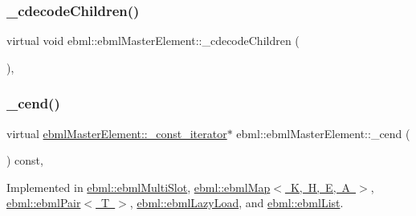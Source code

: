 \subsubsection{\texorpdfstring{\+\_\+cdecode\+Children()}{\_cdecodeChildren()}}
{\footnotesize\ttfamily virtual void ebml\+::ebml\+Master\+Element\+::\+\_\+cdecode\+Children (\begin{DoxyParamCaption}\item[{\mbox{\hyperlink{classebml_1_1parseString_1_1iterator}{parse\+String\+::iterator}} \&}]{ }\end{DoxyParamCaption})\hspace{0.3cm}{\ttfamily [protected]}, {\ttfamily [virtual]}}

\mbox{\label{classebml_1_1ebmlMasterElement_ae6cdbf68d8267a7ab098bd402fa70e88}} 
\subsubsection{\texorpdfstring{\+\_\+cend()}{\_cend()}}
{\footnotesize\ttfamily virtual \mbox{\hyperlink{classebml_1_1ebmlMasterElement_1_1__const__iterator}{ebml\+Master\+Element\+::\+\_\+const\+\_\+iterator}}$\ast$ ebml\+::ebml\+Master\+Element\+::\+\_\+cend (\begin{DoxyParamCaption}{ }\end{DoxyParamCaption}) const\hspace{0.3cm}{\ttfamily [protected]}, {}}



Implemented in \mbox{\hyperlink{classebml_1_1ebmlMultiSlot_a6bc62e4030734829022930e89e94278e}{ebml\+::ebml\+Multi\+Slot}}, \mbox{\hyperlink{classebml_1_1ebmlMap_a2a667c679c5ba26d47d834a42921f988}{ebml\+::ebml\+Map$<$ K, H, E, A $>$}}, \mbox{\hyperlink{classebml_1_1ebmlPair_a555af18316fef979695572e2d0f9a784}{ebml\+::ebml\+Pair$<$ T $>$}}, \mbox{\hyperlink{classebml_1_1ebmlLazyLoad_af4c394b7141c4b5f09a4d9841a4fb239}{ebml\+::ebml\+Lazy\+Load}}, and \mbox{\hyperlink{classebml_1_1ebmlList_abfda97c7cfa6ab0328b444b7ae832b64}{ebml\+::ebml\+List}}.

\mbox{\label{classebml_1_1ebmlMasterElement_a1d1d86beffcd09cbf1ede321c088ef17}} 
